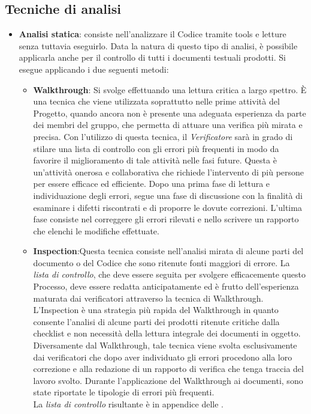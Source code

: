 \subsection{Tecniche di analisi }{
      \label{sec:tecnicheAnalisi}
	\begin{itemize}
		\item \textbf{Analisi statica}: consiste nell’analizzare il Codice tramite tools e letture senza tuttavia eseguirlo. Data la natura di questo tipo di analisi, è possibile applicarla anche per il controllo di tutti i documenti testuali prodotti.
		Si esegue applicando i due seguenti metodi:
		\begin{itemize}
		   	\item \textbf{Walkthrough}: Si svolge effettuando una lettura critica a largo spettro. È una tecnica che viene utilizzata soprattutto nelle prime attività del Progetto, quando ancora non è presente 	una adeguata esperienza da parte dei membri del gruppo, che permetta di attuare una	verifica più mirata e precisa.
		   	Con l’utilizzo di questa tecnica, il \emph{Verificatore} sarà in grado di stilare una lista di	controllo con gli errori più frequenti in modo da favorire il miglioramento di tale attività nelle fasi future.	Questa è un’attività onerosa e collaborativa che richiede l’intervento di più persone per essere efficace ed efficiente. Dopo una prima fase di lettura e individuazione degli errori, segue una fase di discussione con la finalità di esaminare i difetti riscontrati e di proporre le dovute correzioni. L’ultima fase consiste nel correggere gli errori rilevati e	nello scrivere un rapporto che elenchi le modifiche effettuate.
		   
			\item \textbf{Inspection}:Questa tecnica consiste nell’analisi mirata di alcune parti del documento o del Codice che sono ritenute fonti maggiori di errore. La \emph{lista di controllo}, che deve essere seguita per svolgere efficacemente questo Processo, deve essere redatta anticipatamente ed è frutto dell’esperienza maturata dai verificatori attraverso la tecnica di Walkthrough. L'Inspection è una strategia più rapida del Walkthrough in quanto consente l’analisi di alcune parti dei prodotti ritenute critiche dalla checklist e non necessità della lettura	integrale dei documenti in oggetto.	Diversamente dal Walkthrough, tale tecnica viene svolta esclusivamente dai verificatori	che dopo aver individuato gli errori procedono alla loro correzione e alla redazione di un rapporto di verifica che tenga traccia del lavoro svolto.
			Durante l’applicazione del Walkthrough ai documenti, sono state riportate le tipologie di errori più frequenti.\\
			 La \emph{lista di controllo} risultante è in appendice delle \NormeDiProgetto.
			

\end{itemize}
\end{itemize}}

